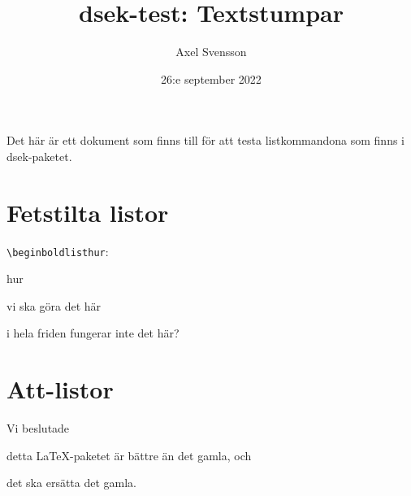 \documentclass{article}
\title{\textsf{dsek}-test: Textstumpar}
\author{Axel Svensson}
\date{26:e september 2022}
\begin{document}
\maketitle

Det här är ett dokument som finns till för att testa listkommandona som finns
i \textsf{dsek}-paketet.


\section{Fetstilta listor}
\texttt{\textbackslash begin{boldlist}{hur}}:
\begin{boldlist}{hur}
\item vi ska göra det här
\item i hela friden fungerar inte det här?
\end{boldlist}

\section{Att-listor}
Vi beslutade
\begin{attlist}
\item detta \LaTeX-paketet är bättre än det gamla, och
\item det ska ersätta det gamla.
\end{attlist}
\end{document}
